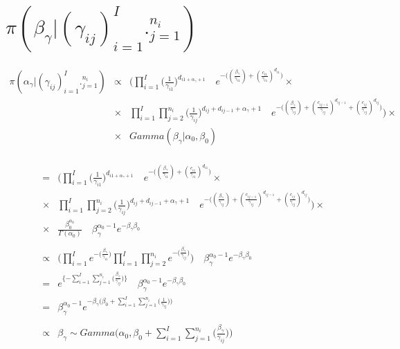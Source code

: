 \documentclass[10pt]{report}
\theoremstyle{plain}
\begin{document}
\section{$\pi(\beta_\gamma|(\gamma_{ij})_{i=1}^I._{j=1}^{n_i})$}
\begin{eqnarray*}
\pi(\alpha_\gamma|(\gamma_{ij})_{i=1}^I._{j=1}^{n_i}) &\propto& \Bigg(\prod_{i=1}^I \bigg(\frac{1}{\gamma_{i1}}\bigg)^{d_{i1+\alpha_\gamma+1}}\quad e^{-\big((\frac{\beta_\gamma}{\gamma_{i1}})+(\frac{c_{i1}}{\gamma_{i1}})^{d_{i1}}\big)}\times\\
&\times& \prod_{i=1}^I \prod_{j=2}^{n_i} \bigg(\frac{1}{\gamma_{ij}}\bigg)^{d_{ij}+d_{ij-1}+\alpha_\gamma+1}\quad e^{-\big((\frac{\beta_\gamma}{\gamma_{ij}})+(\frac{c_{ij-1}}{\gamma_{ij}})^{d_{ij-1}}+(\frac{c_{ij}}{\gamma_{ij}})^{d_{ij}}\big)}\Bigg)\times \\
&\times& Gamma(\beta_\gamma|\alpha_0,\beta_0)
\end{eqnarray*}
\\
\begin{eqnarray*}
&=&\Bigg(\prod_{i=1}^I \bigg(\frac{1}{\gamma_{i1}}\bigg)^{d_{i1+\alpha_\gamma+1}}\quad e^{-\big((\frac{\beta_\gamma}{\gamma_{i1}})+(\frac{c_{i1}}{\gamma_{i1}})^{d_{i1}}\big)}\times\\
&\times& \prod_{i=1}^I \prod_{j=2}^{n_i} \bigg(\frac{1}{\gamma_{ij}}\bigg)^{d_{ij}+d_{ij-1}+\alpha_\gamma+1}\quad e^{-\big((\frac{\beta_\gamma}{\gamma_{ij}})+(\frac{c_{ij-1}}{\gamma_{ij}})^{d_{ij-1}}+(\frac{c_{ij}}{\gamma_{ij}})^{d_{ij}}\big)}\Bigg)\times \\
&\times& \frac{\beta_0^{\alpha_0}}{\Gamma(\alpha_0)} \quad \beta_\gamma^{\alpha_0-1} e^{-\beta_\gamma\beta_0}\\
\\
&\propto& \Bigg(\prod_{i=1}^I e^{-\big(\frac{\beta_\gamma}{\gamma_{i1}}\big)}\prod_{i=1}^I \prod_{j=2}^{n_i} e^{-\big(\frac{\beta_\gamma}{\gamma_{ij}}\big)}\Bigg) \quad \beta_\gamma^{\alpha_0-1} e^{-\beta_\gamma\beta_0}\\
&=&e^{\{-\sum_{i=1}^I \sum_{j=1}^{n_i}\big(\frac{\beta_\gamma}{\gamma_{ij}}\big)\}}\quad \beta_\gamma^{\alpha_0-1} e^{-\beta_\gamma\beta_0}\\
&=& \beta_\gamma^{\alpha_0-1} e^{-\beta_\gamma\big(\beta_0+\sum_{i=1}^I \sum_{j=1}^{n_i}\big(\frac{1}{\gamma_{ij}}\big))}\\
\\
&\propto& \beta_\gamma \sim Gamma\Bigg(\alpha_0,\beta_0+\sum_{i=1}^I \sum_{j=1}^{n_i}\big(\frac{\beta_\gamma}{\gamma_{ij}}\big)\Bigg)
\end{eqnarray*}
\\
\\
\\
\\
\end{document}
